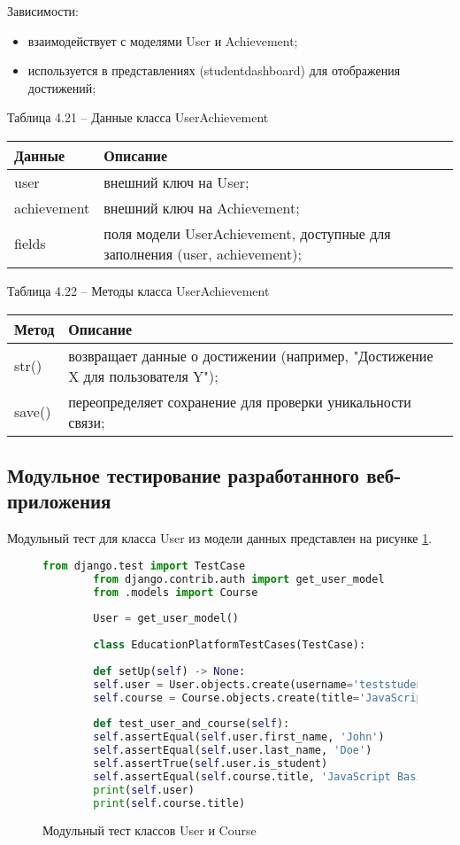 Зависимости: 
\begin{itemize}
	\item взаимодействует с моделями User и Achievement; 
	\item используется в представлениях (studentdashboard) для отображения достижений; 
\end{itemize}

Таблица 4.21 – Данные класса UserAchievement \\
\begin{tabular}{|p{4cm}|p{8cm}|}
	\hline
	Данные & Описание \\
	\hline
	user & внешний ключ на User; \\
	achievement & внешний ключ на Achievement; \\
	fields & поля модели UserAchievement, доступные для заполнения (user, achievement); \\
	\hline
\end{tabular}

Таблица 4.22 – Методы класса UserAchievement \\
\begin{tabular}{|p{4cm}|p{8cm}|}
	\hline
	Метод & Описание \\
	\hline
	str() & возвращает данные о достижении (например, "Достижение X для пользователя Y"); \\
	save() & переопределяет сохранение для проверки уникальности связи; \\
	\hline
\end{tabular}


\subsection{Модульное тестирование разработанного веб-приложения}

Модульный тест для класса User из модели данных представлен на рисунке \ref{unitUser:image}.

\begin{figure}[ht]
	\begin{lstlisting}[language=Python]
		from django.test import TestCase
		from django.contrib.auth import get_user_model
		from .models import Course
		
		User = get_user_model()
		
		class EducationPlatformTestCases(TestCase):
		
		def setUp(self) -> None:
		self.user = User.objects.create(username='teststudent', password='testpass123', first_name='John', last_name='Doe', is_student=True)
		self.course = Course.objects.create(title='JavaScript Basics', description='Introduction to JavaScript', creator=self.user)
		
		def test_user_and_course(self):
		self.assertEqual(self.user.first_name, 'John')
		self.assertEqual(self.user.last_name, 'Doe')
		self.assertTrue(self.user.is_student)
		self.assertEqual(self.course.title, 'JavaScript Basics')
		print(self.user)
		print(self.course.title)
	\end{lstlisting}  
	\caption{Модульный тест классов User и Course}
	\label{unitUser:image}
\end{figure}

